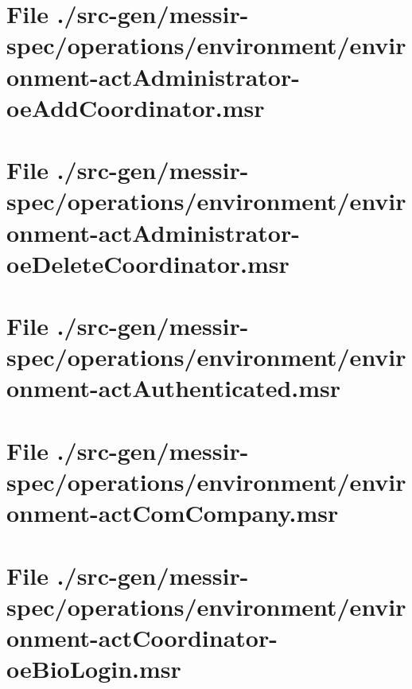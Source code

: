 \section[File /src-gen/messir-spec.../environment-actAdministrator-oeAddCoordinator.msr]{File ./src-gen/messir-spec/operations/environment/environment-actAdministrator-oeAddCoordinator.msr}
\scriptsize

\normalsize
	
\section[File /src-gen.../environment-actAdministrator-oeDeleteCoordinator.msr]{File ./src-gen/messir-spec/operations/environment/environment-actAdministrator-oeDeleteCoordinator.msr}
\scriptsize

\normalsize
	
\section[File /src-gen/messir-spec/operations.../environment-actAuthenticated.msr]{File ./src-gen/messir-spec/operations/environment/environment-actAuthenticated.msr}
\scriptsize

\normalsize
	
\section[File /src-gen/messir-spec/operations/environment/environment-actComCompany.msr]{File ./src-gen/messir-spec/operations/environment/environment-actComCompany.msr}
\scriptsize

\normalsize
	
\section[File /src-gen/messir-spec.../environment-actCoordinator-oeBioLogin.msr]{File ./src-gen/messir-spec/operations/environment/environment-actCoordinator-oeBioLogin.msr}
\scriptsize

\normalsize
	
